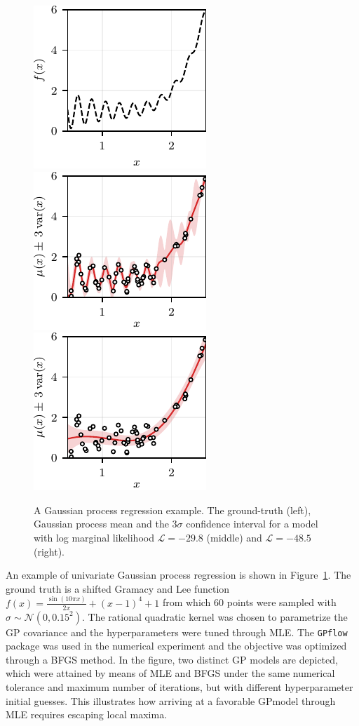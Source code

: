 \begin{figure}[!b]
	\centering
	\includegraphics{../images/chap3_ex_gp_A.pdf} \hspace{3pt}
	\includegraphics{../images/chap3_ex_gp_B.pdf} \hspace{3pt}
	\includegraphics{../images/chap3_ex_gp_C.pdf} 
	\caption{A Gaussian process regression example. The ground-truth (left),  Gaussian process mean and the 3$\sigma$ confidence interval for a model with log marginal likelihood $\mathcal{L}=-29.8$ (middle) and $\mathcal{L}=-48.5$ (right).}
	\label{fig.chap3_gp_ex}
\end{figure}

An example of univariate Gaussian process regression is shown in Figure~\ref{fig.chap3_gp_ex}. The ground truth is a shifted Gramacy and Lee function $f(x) = \frac{\sin(10 \pi x)}{2x} + (x-1)^4 + 1$ from which 60 points were sampled with $\sigma \sim \mathcal{N}(0,0.15^2)$. The rational quadratic kernel was chosen to parametrize the GP covariance and the hyperparameters were tuned through MLE. The \texttt{GPflow} package \citep{matthews2017gpflow} was used in the numerical experiment and the objective was optimized through a BFGS method. In the figure, two distinct GP models are depicted, which were attained by means of MLE and BFGS under the same numerical tolerance and maximum number of iterations, but with different hyperparameter initial guesses. This illustrates how arriving at a favorable GPmodel through MLE requires escaping local maxima.


